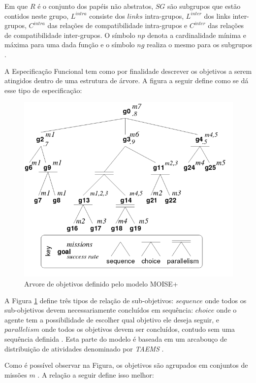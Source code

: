 Em que $R$ é o conjunto dos papéis não abstratos, $SG$ são subgrupos que estão contidos neste grupo, $L^{intra}$ consiste dos $links$ intra-grupos, $L^{inter}$ dos links inter-grupos, 
$C^{intra}$ das relações de compatibilidade intra-grupos e $C^{inter}$ das relações de compatibilidade inter-grupos. O símbolo $np$ denota a cardinalidade mínima e máxima para uma dada 
função e o símbolo $ng$ realiza o mesmo para os subgrupos \cite{moiseframework}. 

A Especificação Funcional tem como por finalidade descrever os objetivos a serem atingidos dentro de uma estrutura de árvore. A figura a seguir define como se dá esse tipo de especificação: 

\begin{figure}[H]
  \centering
  \includegraphics[width=0.8\linewidth]{figure/figmoise} 
  \caption{Arvore de objetivos definido pelo modelo MOISE+ \cite{moiseframework}}
  \label{arvoremoise}
\end{figure}

A Figura \ref{arvoremoise} define três tipos de relação de sub-objetivos: $sequence$ onde todos os sub-objetivos devem necessariamente concluídos em sequência: $choice$ onde o agente tem a possibilidade de escolher qual objetivo ele deseja seguir, e $parallelism$ onde todos os objetivos devem ser concluídos, contudo sem uma sequência definida \cite{taems01} \cite{taems02}. Esta parte do modelo é baseada em um arcabouço de distribuição de atividades denominado por \textit{TAEMS} \cite{TAEMS}. 

Como é possível observar na Figura, os objetivos são agrupados em conjuntos de missões $m$ \cite{dynamicagenttemporalstruct}. A relação a seguir define isso melhor:

